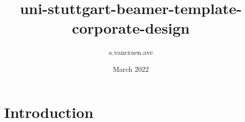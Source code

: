 \documentclass{article}
\title{uni-stuttgart-beamer-template-corporate-design}
\author{a.vancraen.avc }
\date{March 2022}
\begin{document}
\maketitle

\section{Introduction}
\end{document}
